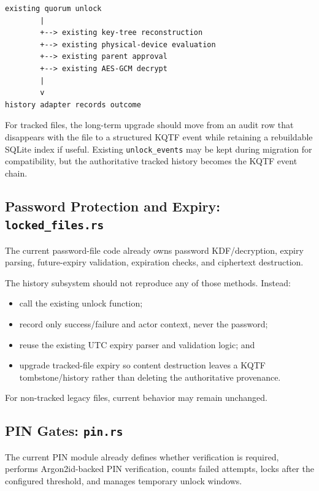 \documentclass[11pt]{article}
\begin{document}
\begin{lstlisting}
existing quorum unlock
        |
        +--> existing key-tree reconstruction
        +--> existing physical-device evaluation
        +--> existing parent approval
        +--> existing AES-GCM decrypt
        |
        v
history adapter records outcome
\end{lstlisting}

For tracked files, the long-term upgrade should move from an audit row that disappears with the file to a structured KQTF event while retaining a rebuildable SQLite index if useful. Existing \texttt{unlock\_events} may be kept during migration for compatibility, but the authoritative tracked history becomes the KQTF event chain.

\subsection{Password Protection and Expiry: \texttt{locked\_files.rs}}

The current password-file code already owns password KDF/decryption, expiry parsing, future-expiry validation, expiration checks, and ciphertext destruction.

The history subsystem should not reproduce any of those methods. Instead:

\begin{itemize}[leftmargin=1.5em]
  \item call the existing unlock function;
  \item record only success/failure and actor context, never the password;
  \item reuse the existing UTC expiry parser and validation logic; and
  \item upgrade tracked-file expiry so content destruction leaves a KQTF tombstone/history rather than deleting the authoritative provenance.
\end{itemize}

For non-tracked legacy files, current behavior may remain unchanged.

\subsection{PIN Gates: \texttt{pin.rs}}

The current PIN module already defines whether verification is required, performs Argon2id-backed PIN verification, counts failed attempts, locks after the configured threshold, and manages temporary unlock windows.
\end{document}
